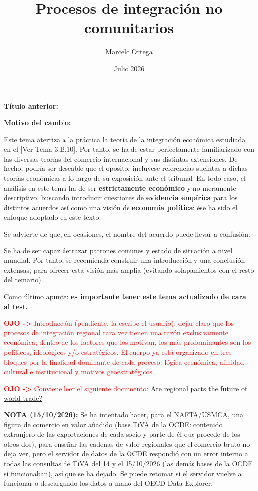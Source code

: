 \documentclass[10pt,a4paper]{article}
\title{Procesos de integración no comunitarios\\
\large }
\author{Marcelo Ortega}
\date{Julio 2026}
\newcommand{\puntosclave}[1]{%
  \begin{tcolorbox}[
    colframe=black,
    title={Puntos clave},
    before upper={\setlength{\parindent}{0.5cm}\setlength{\parskip}{0.5\baselineskip}}
  ]
  #1
  \end{tcolorbox}
}
\newcommand{\modificaciones}[1]{
  \begin{tcolorbox}[
    colback=white,
    colframe=red,
    title={Modificaciones a realizar},
    before upper={\setlength{\parindent}{0.5cm}\setlength{\parskip}{0.5\baselineskip}}
  ]
  #1
  \end{tcolorbox}
}
\newcommand{\changebox}{%
\begin{tcolorbox}[title={Historial de cambios del tema}]
\textbf{Título anterior:} \OldTitle\par
\textbf{Motivo del cambio:} \ChangeWhy
\end{tcolorbox}
}
\newcommand{\authorfont}[1]{{\fontfamily{EBGaramond-TLF}\selectfont #1}}
\begin{document}
\maketitle
\changebox

\newpage

\puntosclave{ %
     Este tema aterriza a la práctica la teoría de la integración económica estudiada en el [\authorfont{Ver Tema 3.B.10}]. Por tanto, se ha de estar perfectamente familiarizado con las diversas teorías del comercio internacional y sus distintas extensiones. De hecho, podría ser deseable que el opositor incluyese referencias sucintas a dichas teorías económicas a lo largo de su exposición ante el tribunal. En todo caso, el análisis en este tema ha de ser \textbf{estrictamente económico} y no meramente descriptivo, buscando introducir cuestiones de \textbf{evidencia empírica} para los distintos acuerdos así como una visión de \textbf{economía política}: ése ha sido el enfoque adoptado en este texto.

     Se advierte de que, en ocasiones, el nombre del acuerdo puede llevar a confusión.

     Se ha de ser capaz detrazar patrones comunes y estado de situación a nivel mundial. Por tanto, se recomienda construir una introducción y una conclusión extensas, para ofrecer esta visión más amplia (evitando solapamientos con el resto del temario).

     Como último apunte: \textbf{es importante tener este tema actualizado de cara al test.}
    }
\vspace{1cm}

\modificaciones{
    \textcolor{red}{\textbf{OJO ->} Introducción (pendiente, la escribe el usuario): dejar claro que los procesos de integración regional rara vez tienen una razón exclusivamente económica; dentro de los factores que los motivan, los más predominantes son los políticos, ideológicos y/o estratégicos. El cuerpo ya está organizado en tres bloques por la finalidad dominante de cada proceso: lógica económica, afinidad cultural e institucional y motivos geoestratégicos.}

    \textcolor{red}{\textbf{OJO ->} Conviene leer el siguiente documento:} \href{https://www.piie.com/blogs/realtime-economics/2026/are-regional-pacts-future-world-trade}{Are regional pacts the future of world trade?}

    \textbf{NOTA (15/10/2026):} Se ha intentado hacer, para el NAFTA/USMCA, una figura de comercio en valor añadido (base TiVA de la OCDE: contenido extranjero de las exportaciones de cada socio y parte de él que procede de los otros dos), para enseñar las cadenas de valor regionales que el comercio bruto no deja ver, pero el servidor de datos de la OCDE respondió con un error interno a todas las consultas de TiVA del 14 y el 15/10/2026 (las demás bases de la OCDE sí funcionaban), así que se ha dejado. Se puede retomar si el servidor vuelve a funcionar o descargando los datos a mano del OECD Data Explorer.
    }
\end{document}
